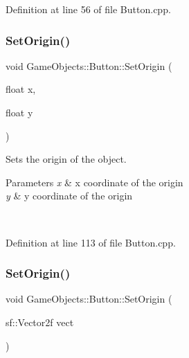 Definition at line 56 of file Button.\+cpp.


\begin{DoxyCode}{0}

\end{DoxyCode}
\mbox{\label{class_game_objects_1_1_button_a3404fcd2a6347a8700557ae204f316fc}} 
\subsubsection{\texorpdfstring{SetOrigin()}{SetOrigin()}\hspace{0.1cm}{\footnotesize\ttfamily [1/2]}}
{\footnotesize\ttfamily void Game\+Objects\+::\+Button\+::\+Set\+Origin (\begin{DoxyParamCaption}\item[{float}]{x,  }\item[{float}]{y }\end{DoxyParamCaption})}



Sets the origin of the object. 


\begin{DoxyParams}{Parameters}
{\em x} & x coordinate of the origin\\
\hline
{\em y} & y coordinate of the origin \begin{DoxyVerb}\end{DoxyVerb}
 \\
\hline
\end{DoxyParams}


Definition at line 113 of file Button.\+cpp.


\begin{DoxyCode}{0}

\end{DoxyCode}
\mbox{\label{class_game_objects_1_1_button_acbcba8110b0bbe64ebb48a7f54018f14}} 
\subsubsection{\texorpdfstring{SetOrigin()}{SetOrigin()}\hspace{0.1cm}{\footnotesize\ttfamily [2/2]}}
{\footnotesize\ttfamily void Game\+Objects\+::\+Button\+::\+Set\+Origin (\begin{DoxyParamCaption}\item[{sf\+::\+Vector2f}]{vect }\end{DoxyParamCaption})}



